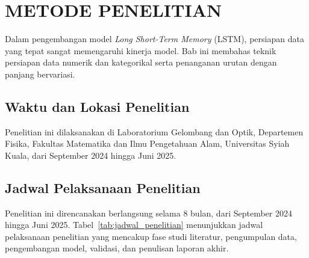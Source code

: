 

\chapter{METODE PENELITIAN}

Dalam pengembangan model \textit{Long Short-Term Memory} (LSTM), persiapan data yang tepat sangat memengaruhi kinerja model. Bab ini membahas teknik persiapan data numerik dan kategorikal serta penanganan urutan dengan panjang bervariasi.

\section{Waktu dan Lokasi Penelitian}
Penelitian ini dilaksanakan di Laboratorium Gelombang dan Optik, Departemen Fisika, Fakultas Matematika dan Ilmu Pengetahuan Alam, Universitas Syiah Kuala, dari September 2024 hingga Juni 2025.

\section{Jadwal Pelaksanaan Penelitian}
Penelitian ini direncanakan berlangsung selama 8 bulan, dari September 2024 hingga Juni 2025. Tabel~\ref{tab:jadwal_penelitian} menunjukkan jadwal pelaksanaan penelitian yang mencakup fase studi literatur, pengumpulan data, pengembangan model, validasi, dan penulisan laporan akhir.


